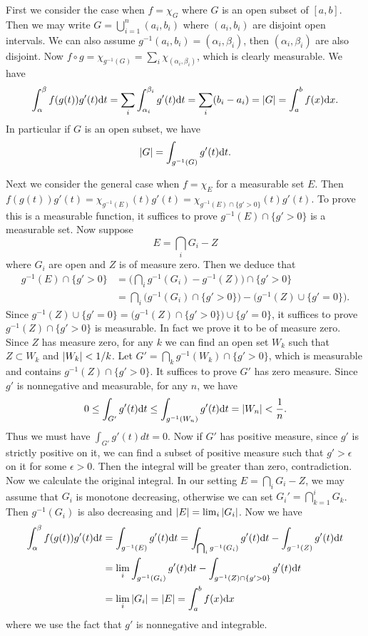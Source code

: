 \begin{exercise}{7.11}
   First we consider the case when $f=\chi_G$ where $G$ is an open subset of $[a,b]$. Then we may write $G=\bigcup_{i=1}^n (a_i,b_i)$ where $(a_i,b_i)$ are disjoint open intervals. We can also assume $g^{-1}(a_i,b_i)=(\alpha_i,\beta_i)$, then $(\alpha_i,\beta_i)$ are also disjoint. Now $f\circ g=\chi_{g^{-1}(G)}=\sum_i\chi_{(\alpha_i,\beta_i)}$, which is clearly measurable. We have
   \[
     \int_\alpha^\beta f(g(t))g'(t)\mathrm{d} t=\sum_i\int_{\alpha_i}^{\beta_i}g'(t)\mathrm{d} t=\sum_i (b_i-a_i)=\left\vert G\right\vert=\int_{a}^{b}f(x)\mathrm{d} x.
   \]
   In particular if $G$ is an open subset, we have
   \[
     \left\vert G\right\vert=\int_{g^{-1}(G)}g'(t)\mathrm{d} t.
   \]
   
   Next we consider the general case when $f=\chi_E$ for a measurable set $E$. Then $f(g(t))g'(t)=\chi_{g^{-1}(E)}(t)g'(t)=\chi_{g^{-1}(E)\cap\{g'>0\}}(t)g'(t)$. To prove this is a measurable function, it suffices to prove $g^{-1}(E)\cap\{g'>0\}$ is a measurable set. Now suppose 
   \[
     E=\bigcap_iG_i-Z
   \]
   where $G_i$ are open and $Z$ is of measure zero. Then we deduce that
   \begin{align*}
       g^{-1}(E)\cap\{g'>0\}&=\big(\bigcap_ig^{-1}(G_i)-g^{-1}(Z)\big)\cap\{g'>0\}\\
       &=\bigcap_i\big(g^{-1}(G_i)\cap\{g'>0\}\big)-\big(g^{-1}(Z)\cup\{g'=0\}\big).
   \end{align*}
   Since $g^{-1}(Z)\cup\{g'=0\}=\big(g^{-1}(Z)\cap\{g'>0\}\big)\cup\{g'=0\}$, it suffices to prove $g^{-1}(Z)\cap\{g'>0\}$ is measurable. In fact we prove it to be of measure zero. Since $Z$ has measure zero, for any $k$ we can find an open set $W_k$ such that $Z\subset W_k$ and $\left\vert W_k\right\vert<1/k$. Let $G'=\bigcap_k g^{-1}(W_k)\cap\{g'>0\}$, which is measurable and contains $g^{-1}(Z)\cap\{g'>0\}$. It suffices to prove $G'$ has zero measure. Since $g'$ is nonnegative and measurable, for any $n$, we have
   \[
     0\leq\int_{G'}g'(t)\mathrm{d} t\leq \int_{g^{-1}(W_n)}g'(t)\mathrm{d} t=\left\vert W_n\right\vert<\frac{1}{n}.
   \]
   Thus we must have $\int_{G'}g'(t)dt=0$. Now if $G'$ has positive measure, since $g'$ is strictly positive on it, we can find a subset of positive measure such that $g'>\epsilon$ on it for some $\epsilon>0$. Then the integral will be greater than zero, contradiction. Now we calculate the original integral. In our setting $E=\bigcap_iG_i-Z$, we may assume that $G_i$ is monotone decreasing, otherwise we can set $G_i'=\bigcap_{k=1}^iG_k$. Then $g^{-1}(G_i)$ is also decreasing and $\left\vert E\right\vert=\lim_i\left\vert G_i\right\vert$. Now we have
   \begin{align*}
       \int_\alpha^\beta f(g(t))g'(t)\mathrm{d} t&=\int_{g^{-1}(E)}g'(t)\mathrm{d} t=\int_{\bigcap_ig^{-1}(G_i)}g'(t)\mathrm{d} t-\int_{g^{-1}(Z)}g'(t)\mathrm{d} t\\
       &=\lim_i\int_{g^{-1}(G_i)}g'(t)\mathrm{d} t-\int_{g^{-1}(Z)\cap\{g'>0\}}g'(t)\mathrm{d} t\\
       &=\lim_i\left\vert G_i\right\vert=\left\vert E\right\vert=\int_a^bf(x)\mathrm{d} x
   \end{align*}
   where we use the fact that $g'$ is nonnegative and integrable.
   

\end{exercise}
